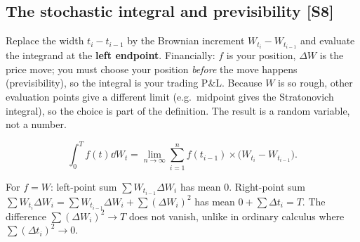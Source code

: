 \documentclass[10pt]{article}
\begin{document}
\subsection{The stochastic integral and previsibility [S8]}
\begin{idea}
Replace the width $t_i-t_{i-1}$ by the Brownian increment $W_{t_i}-W_{t_{i-1}}$ and evaluate the integrand at the \textbf{left endpoint}. Financially: $f$ is your position, $\Delta W$ is the price move; you must choose your position \emph{before} the move happens (previsibility), so the integral is your trading P\&L. Because $W$ is so rough, other evaluation points give a different limit (e.g.\ midpoint gives the Stratonovich integral), so the choice is part of the definition. The result is a random variable, not a number.
\end{idea}
\[\int_0^Tf(t)\dd W_t=\lim_{n\to\infty}\sum_{i=1}^nf(t_{i-1})\times\big(W_{t_i}-W_{t_{i-1}}\big).\]
\begin{where}
\end{where}
\begin{worked}
For $f=W$: left-point sum $\sum W_{t_{i-1}}\Delta W_i$ has mean $0$. Right-point sum $\sum W_{t_i}\Delta W_i=\sum W_{t_{i-1}}\Delta W_i+\sum(\Delta W_i)^2$ has mean $0+\sum\Delta t_i=T$. The difference $\sum(\Delta W_i)^2\to T$ does not vanish, unlike in ordinary calculus where $\sum(\Delta t_i)^2\to0$.
\end{worked}
\end{document}
